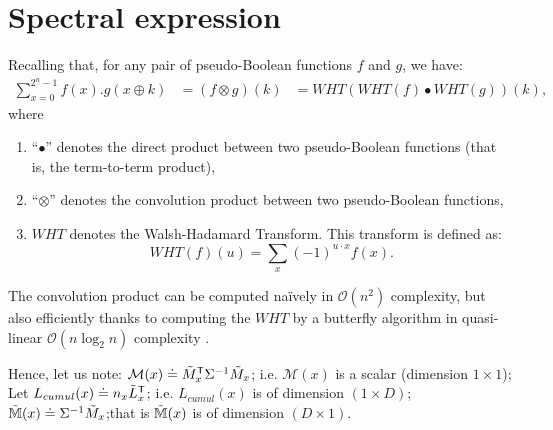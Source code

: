 \documentclass[conference,twocolumn]{IEEEtran}
\begin{document}
\section{Spectral expression}\label{sec-spectral}

Recalling that, for any pair of pseudo-Boolean functions $f$ and $g$, we have: 
\begin{align*}
\sum_{x=0}^{2^n-1}f(x).g(x \oplus k)&=(f \otimes g)(k)%
&=WHT(WHT(f) \bullet WHT(g))(k) ,
\end{align*}
where 
\begin{enumerate}
    \item ``$\bullet$'' denotes the direct product between two pseudo-Boolean functions (that is, the term-to-term product),
    \item ``$\otimes$'' denotes the convolution product between two pseudo-Boolean functions,
    \item $WHT$ denotes the Walsh-Hadamard Transform. This transform is defined as:
$$WHT(f)(u) = \sum_x (-1)^{u \cdot x} f(x).$$
\end{enumerate}
The convolution product can be computed naïvely in $\mathcal{O}(n^2)$ complexity, but also efficiently thanks to computing the $WHT$ by a butterfly algorithm in quasi-linear $\mathcal{O}(n \log_2 n)$ complexity \cite{hedayat1978}.

Hence, let us note:
 $\mathcal{M}(x) \doteq \Tilde{M}^\mathsf{T}_{x} \Sigma^{-1} \Tilde{M}_{x}$; \; i.e. $\mathcal{M}(x)$ is a scalar (dimension $1 \times 1$);
%
Let $L_{cumul}(x) \doteq n_x\Tilde{L}^\mathsf{T}_x$; \; i.e. $L_{cumul}(x)$ is of dimension $(1 \times D)$;
%
 $\Tilde{\mathbb{M}}(x) \doteq \Sigma^{-1}\Tilde{M}_{x}  $;\;that is $\Tilde{\mathbb{M}}(x)$ is of dimension $(D \times 1)$.

 
 
 
 
\end{document}
